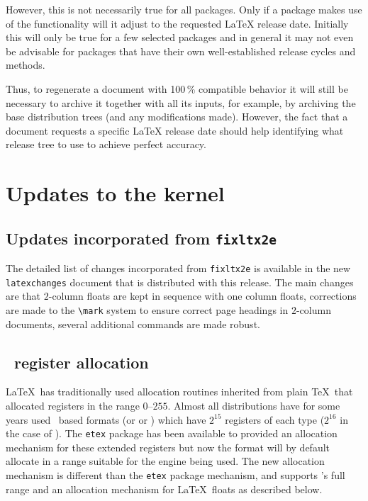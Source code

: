 \documentclass{ltnews}
\providecommand\pkg[1]{\texttt{#1}}
\providecommand\file[1]{\texttt{#1}}
\begin{document}
However, this is not necessarily true for all packages.
 Only if a package makes use of the 
functionality will it adjust to the
requested \LaTeX{} release date. Initially this will only be true for
a few selected packages and in general it may not even be advisable for packages
that have their own well-established release cycles and methods.

Thus, to regenerate a document with 100\,\% compatible behavior
it will still be necessary
to archive it together with all its inputs, for example, by archiving
the base distribution trees (and any modifications made). However, the
fact that a document requests a specific \LaTeX{} release date should
help identifying what release tree to use to achieve perfect accuracy.


\section{Updates to the kernel}

\subsection{Updates incorporated from \pkg{fixltx2e}}

The detailed list of changes incorporated from \pkg{fixltx2e} is
available in the new \file{latexchanges} document that is
distributed with this release. The main changes are that $2$-column
floats are kept in sequence with one column floats, corrections are
made to the \verb|\mark| system to ensure correct page headings in
$2$-column documents, several additional commands are made robust.

\subsection{\eTeX\ register allocation}

\LaTeX\ has traditionally used allocation routines inherited from plain \TeX\
that allocated registers in the range $0$--$255$. Almost all distributions have
for some years used \eTeX\ based formats (or \hologo{XeTeX} or )
which have $2^{15}$ registers of each type ($2^{16}$ in the case of
\hologo{LuaTeX}). The \pkg{etex} package has been available to provided an
allocation mechanism for these extended registers but now the format will by
default allocate in a range suitable for the engine being used. The new
allocation mechanism is different than the \pkg{etex} package mechanism, and
supports \hologo{LuaTeX}'s full range and an allocation mechanism for \LaTeX\
floats as described below.
\end{document}

